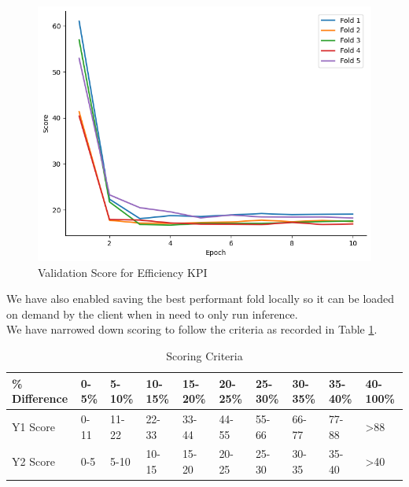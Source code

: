 \documentclass{report} %
\begin{document}
\begin{figure}[H]
    \hfill
    \begin{minipage}[b]{0.325\textwidth}
        \includegraphics[width=\textwidth]{./ReportImages/val_score_y2.png}
        \caption{\centering Validation Score for Efficiency \ac{KPI}}
        \label{fig:Validation Score for Efficiency grid}
    \end{minipage}
\end{figure}

We have also enabled saving the best performant fold locally so it can be loaded on demand by the client when in need to only run inference.\\
We have narrowed down scoring to follow the criteria as recorded in Table \ref{tab:Scoring Criteria}.

\begin{table}[H]
    \centering
    \begin{tabularx}{1\linewidth}{|X|X|X|X|X|X|X|X|X|X|}
    \hline {\bf \% Difference} & {\bf 0-5\%} & {\bf 5-10\%} & {\bf 10-15\%} & {\bf 15-20\%} & {\bf 20-25\%} & {\bf 25-30\%} & {\bf 30-35\%} & {\bf 35-40\%} & {\bf 40-100\%}\\
    \hline 
    Y1 Score& 0-11& 11-22 & 22-33 & 33-44 & 44-55& 55-66 & 66-77 & 77-88 & \textgreater 88\\
    Y2 Score& 0-5 & 5-10 & 10-15 & 15-20 & 20-25& 25-30 & 30-35 & 35-40 &\textgreater 40\\
    \hline
    \end{tabularx}
    \caption{Scoring Criteria}
    \label{tab:Scoring Criteria}
\end{table}
\end{document}
